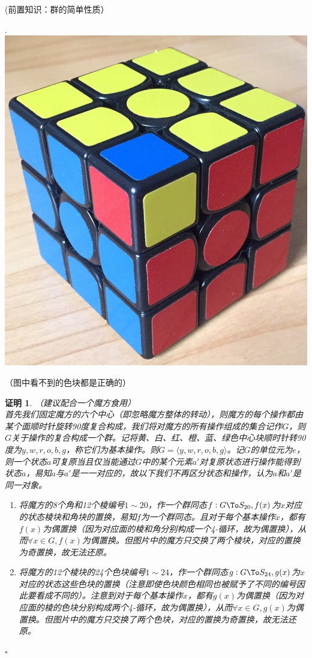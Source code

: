 \documentclass[UTF8, a4paper, 12pt, oneside, twocolumn]{article}
\numberwithin{equation}{section}
\numberwithin{figure}{section}
\numberwithin{table}{section}
\newtheorem*{Proof}{证明}
\newif\ifproof
\newenvironment{Ex}[1][]{\prooffalse \begin{EExercise}{#1}{}}%
{\ifproof%
\hfill\ensuremath{\square}\end{Proof}%
\fi%
\end{EExercise}}
\newcommand{\pr}{\tcblower \begin{Proof}\prooftrue }
\begin{document}
\begin{Ex}[(前置知识：群的简单性质）]
\begin{minipage}{0.3\linewidth}
\end{minipage}
\begin{minipage}{0.3\linewidth}
.
\includegraphics[width=\linewidth]{zj.jpg}
\end{minipage}
（图中看不到的色块都是正确的）
\pr 
（建议配合一个魔方食用）\\
首先我们固定魔方的六个中心（即忽略魔方整体的转动），则魔方的每个操作都由某个面顺时针旋转90度复合构成，我们将对魔方的所有操作组成的集合记作$G$，则$G$关于操作的复合构成一个群。记将黄、白、红、橙、蓝、绿色中心块顺时针转90度为$y,w,r,o,b,g$，称它们为基本操作。则$G=\langle y,w,r,o,b,g\rangle$。记$G$的单位元为$e$，则一个状态$a$可复原当且仅当能通过$G$中的某个元素$a'$对复原状态进行操作能得到状态$a$，易知$a$与$a'$是一一对应的，故以下我们不再区分状态和操作，认为$a$和$a'$是同一对象。
\begin{enumerate}
\item 将魔方的8个角和12个棱编号$1\sim20$，作一个群同态$f:G\To S_{20},f(x)$为$x$对应的状态棱块和角块的置换，易知$f$为一个群同态。且对于每个基本操作$x$，都有$f(x)$为偶置换（因为对应面的棱和角分别构成一个4-循环，故为偶置换），从而$\forall x\in G,f(x)$为偶置换。但图片中的魔方只交换了两个棱块，对应的置换为奇置换，故无法还原。
\item 将魔方的12个棱块的24个色块编号$1\sim 24$，作一个群同态$g:G\To S_{24},g(x)$为$x$对应的状态这些色块的置换（注意即使色块颜色相同也被赋予了不同的编号因此要看成不同的）。注意到对于每个基本操作$x$，都有$g(x)$为偶置换（因为对应面的棱的色块分别构成两个4-循环，故为偶置换），从而$\forall x\in G,g(x)$为偶置换。但图片中的魔方只交换了两个色块，对应的置换为奇置换，故无法还原。

\end{enumerate}
\end{Ex}
\end{document}
